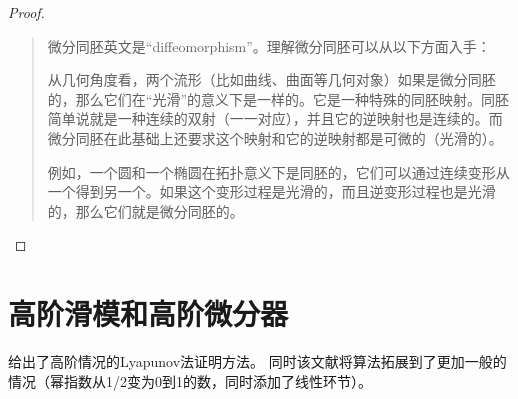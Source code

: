 \begin{proof}
	
	\begin{quote}
		微分同胚英文是“diffeomorphism”。理解微分同胚可以从以下方面入手：
		
		从几何角度看，两个流形（比如曲线、曲面等几何对象）如果是微分同胚的，那么它们在“光滑”的意义下是一样的。它是一种特殊的同胚映射。同胚简单说就是一种连续的双射（一一对应），并且它的逆映射也是连续的。而微分同胚在此基础上还要求这个映射和它的逆映射都是可微的（光滑的）。
		
		例如，一个圆和一个椭圆在拓扑意义下是同胚的，它们可以通过连续变形从一个得到另一个。如果这个变形过程是光滑的，而且逆变形过程也是光滑的，那么它们就是微分同胚的。
	\end{quote}
	
	
\end{proof}





\section{高阶滑模和高阶微分器}

\cite{morenoSurveyHighorderSlidingmode2023}给出了高阶情况的Lyapunov法证明方法。
同时该文献将算法拓展到了更加一般的情况（幂指数从1/2变为0到1的数，同时添加了线性环节）。

